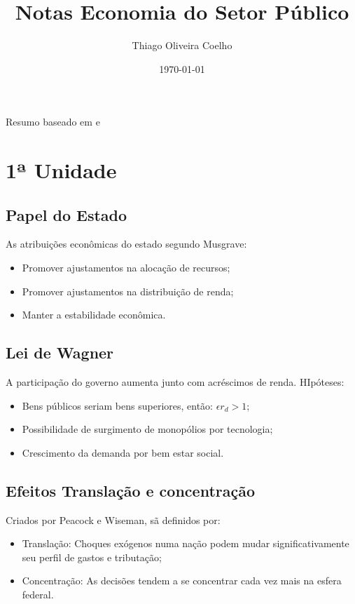 \documentclass[12pt,a4paper,oneside,brazil]{abntex2}
\title{Notas Economia do Setor Público}
\author{Thiago Oliveira Coelho}
\date{\today}
\begin{document}
\pagestyle{plain}

\maketitle
\begin{center}
Resumo baseado em \cite{rezende} e \cite{biderman} 
\end{center}
\tableofcontents
\chapter{1ª Unidade}

\section{Papel do Estado} 
As atribuições econômicas do estado segundo Musgrave:
\begin{itemize}
\item Promover ajustamentos na alocação de recursos;
\item Promover ajustamentos na distribuição de renda;
\item Manter a estabilidade econômica.
\end{itemize}

\section{Lei de Wagner}
A participação do governo aumenta junto com acréscimos de renda. HIpóteses:
\begin{itemize}
\item Bens públicos seriam bens superiores, então: $ \epsilon r_d >1$;
\item Possibilidade de surgimento de monopólios por tecnologia;
\item Crescimento da demanda por bem estar social.
\end{itemize}

\section{Efeitos Translação e concentração}
Criados por Peacock e Wiseman, sã definidos por:
\begin{itemize}
\item Translação: Choques exógenos numa nação podem mudar significativamente seu perfil de gastos e tributação;
\item Concentração: As decisões tendem a se concentrar cada vez mais na esfera federal.
\end{itemize}
\end{document}
